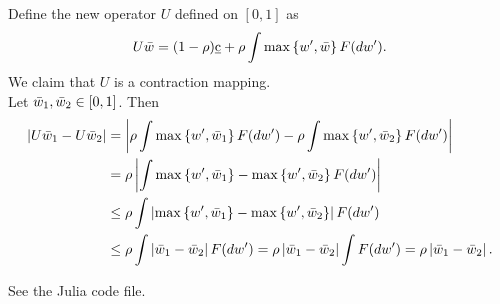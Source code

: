 \documentclass[12pt]{article}
\begin{document}
\begin{sol}[4.2. Conti]
    Define the new operator $U$ defined on $[0,1]$ as 
    \begin{equation*}
        U\Bar{w} = (1-\rho)\underbar{c} + \rho \int \max\left\{ {w', \Bar{w}} \right\} F(dw').
    \end{equation*}
    We claim that $U$ is a contraction mapping. \\
    Let $\Bar{w}_1, \Bar{w}_2\in[0,1]$. Then 
    \begin{equation*}
        \begin{aligned}
            \left\lvert {U\Bar{w}_1 - U\Bar{w}_2} \right\rvert 
            &= \left\lvert {\rho \int \max\left\{ {w', \Bar{w}_1} \right\} F(dw') - \rho \int \max\left\{ {w', \Bar{w}_2} \right\} F(dw')} \right\rvert\\
            &= \rho\left\lvert {\int \max\left\{ {w', \Bar{w}_1} \right\}-\max\left\{ {w', \Bar{w}_2} \right\} F(dw')} \right\rvert\\
            &\leq \rho \int\left\lvert {\max\left\{ {w', \Bar{w}_1} \right\}-\max\left\{ {w', \Bar{w}_2} \right\}} \right\rvert F(dw')\\
            &\leq \rho \int\left\lvert {\Bar{w}_1-\Bar{w}_2} \right\rvert F(dw') = \rho \left\lvert {\Bar{w}_1-\Bar{w}_2} \right\rvert\int F(dw') = \rho \left\lvert {\Bar{w}_1-\Bar{w}_2} \right\rvert.
        \end{aligned}
    \end{equation*}
\end{sol}
\begin{sol}[4.3, 4.4, 4.5]
    See the Julia code file. 
\end{sol}
\end{document}
